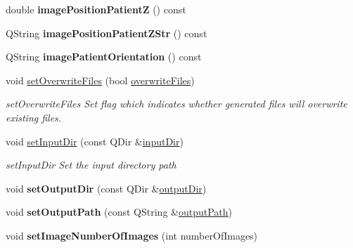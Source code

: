 \begin{DoxyCompactItemize}
\item 
\mbox{\label{class_series_info_a5a53ec11248767dc34393520ddc64d81}} 
double {\bfseries image\+Position\+PatientZ} () const
\item 
\mbox{\label{class_series_info_afd3b1a76c1f8986a5a787e2909df8b3f}} 
Q\+String {\bfseries image\+Position\+Patient\+Z\+Str} () const
\item 
\mbox{\label{class_series_info_ab31237968717e9c71d21d20a3929d115}} 
Q\+String {\bfseries image\+Patient\+Orientation} () const
\item 
void \hyperlink{class_series_info_a09ff36a5e9ad4ec4cd2030a8e5abefa2}{set\+Overwrite\+Files} (bool \hyperlink{class_series_info_a21fe1bd18d2f9e2b1f7ceb22e7ad98a3}{overwrite\+Files})
\begin{DoxyCompactList}\small\item\em set\+Overwrite\+Files Set flag which indicates whether generated files will overwrite existing files. \end{DoxyCompactList}\item 
void \hyperlink{class_series_info_a19ce250d3f423a513a6492b9bd5aa908}{set\+Input\+Dir} (const Q\+Dir \&\hyperlink{class_series_info_ab30b8c01a3413b913f00203b2ef5a117}{input\+Dir})
\begin{DoxyCompactList}\small\item\em set\+Input\+Dir Set the input directory path \end{DoxyCompactList}\item 
\mbox{\label{class_series_info_acf0f521d849807a9382fa791bf745482}} 
void {\bfseries set\+Output\+Dir} (const Q\+Dir \&\hyperlink{class_series_info_af94b9048bc3b60b5d151f227299b394b}{output\+Dir})
\item 
\mbox{\label{class_series_info_a2124d48ae7a2b09d99f7a3e3e67155f2}} 
void {\bfseries set\+Output\+Path} (const Q\+String \&\hyperlink{class_series_info_a7088530574522d3d1123806c766402f2}{output\+Path})
\item 
\mbox{\label{class_series_info_ad94c20360198b39fd185cf77a158e4b3}} 
void {\bfseries set\+Image\+Number\+Of\+Images} (int number\+Of\+Images)
\item 
\mbox{\label{class_series_info_ac3bc2f9b3b730ca1f6d9f5ee4f26d6ba}} 

\end{DoxyCompactItemize}
